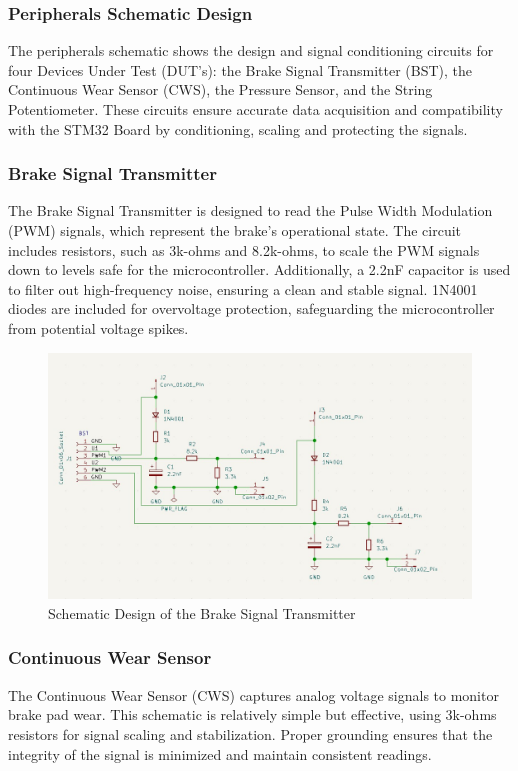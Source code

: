 \documentclass[12pt]{article}
\begin{document}
\subsubsection{Peripherals Schematic Design}
The peripherals schematic shows the design and signal conditioning circuits for
four Devices Under Test (DUT’s): the Brake Signal Transmitter (BST), the
Continuous Wear Sensor (CWS), the Pressure Sensor, and the String
Potentiometer. These circuits ensure accurate data acquisition and
compatibility with the STM32 Board by conditioning, scaling and protecting the
signals.

\subsubsection*{Brake Signal Transmitter}
The Brake Signal Transmitter is designed to read the Pulse Width Modulation
(PWM) signals, which represent the brake’s operational state. The circuit
includes resistors, such as 3k-ohms and 8.2k-ohms, to scale the PWM signals
down to levels safe for the microcontroller. Additionally, a 2.2nF capacitor is
used to filter out high-frequency noise, ensuring a clean and stable signal.
1N4001 diodes are included for overvoltage protection, safeguarding the
microcontroller from potential voltage spikes.

\begin{figure}[H]
  \includegraphics[width=\textwidth]{../assets/pcb/image2.jpg}
  \caption{Schematic Design of the Brake Signal Transmitter}
\end{figure}

\subsubsection*{Continuous Wear Sensor}
The Continuous Wear Sensor (CWS) captures analog voltage signals to monitor
brake pad wear. This schematic is relatively simple but effective, using
3k-ohms resistors for signal scaling and stabilization. Proper grounding
ensures that the integrity of the signal is minimized and maintain consistent
readings.
\end{document}
